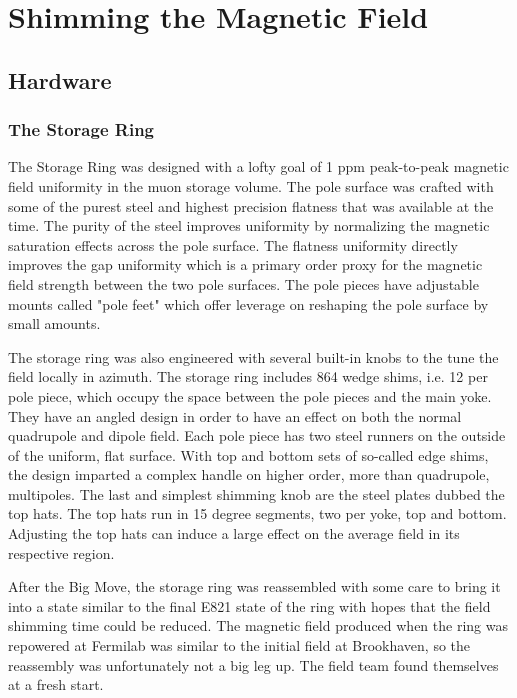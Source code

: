 \chapter {Shimming the Magnetic Field}

\section{Hardware}

\subsection{The Storage Ring}

The \gmtwo Storage Ring was designed with a lofty goal of 1 ppm peak-to-peak magnetic field uniformity in the muon storage volume.  The pole surface was crafted with some of the purest steel and highest precision flatness that was available at the time. The purity of the steel improves uniformity by normalizing the magnetic saturation effects across the pole surface.  The flatness uniformity directly improves the gap uniformity which is a primary order proxy for the magnetic field strength between the two pole surfaces. The pole pieces have adjustable mounts called "pole feet" which offer leverage on reshaping the pole surface by small amounts. 


The storage ring was also engineered with several built-in knobs to the tune the field locally in azimuth.  The storage ring includes 864 wedge shims, i.e. 12 per pole piece, which occupy the space between the pole pieces and the main yoke.  They have an angled design in order to have an effect on both the normal quadrupole and dipole field.  Each pole piece has two steel runners on the outside of the uniform, flat surface.  With top and bottom sets of so-called edge shims, the design imparted a complex handle on higher order, more than quadrupole, multipoles. The last and simplest shimming knob are the steel plates dubbed the top hats.  The top hats run in 15 degree segments, two per yoke, top and bottom.  Adjusting the top hats can induce a large effect on the average field in its respective region.  


After the Big Move, the storage ring was reassembled with some care to bring it into a state similar to the final E821 state of the ring with hopes that the field shimming time could be reduced.  The magnetic field produced when the ring was repowered at Fermilab was similar to the initial field at Brookhaven, so the reassembly was unfortunately not a big leg up.  The field team found themselves at a fresh start.

